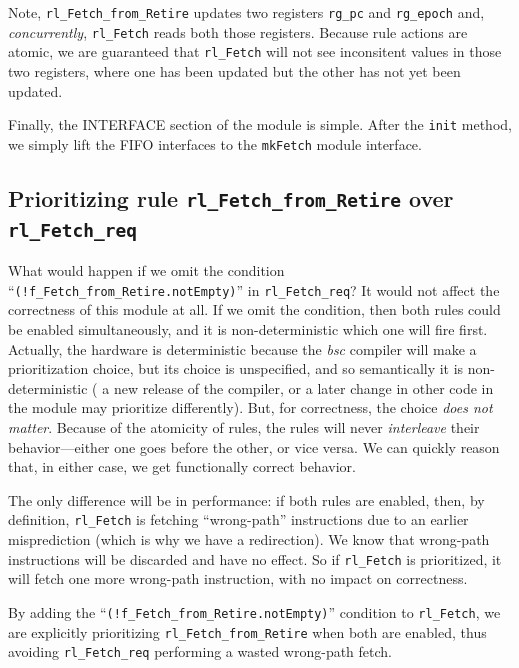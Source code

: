Note, \verb|rl_Fetch_from_Retire| updates two registers \verb|rg_pc|
and \verb|rg_epoch| and, \emph{concurrently}, \verb|rl_Fetch| reads
both those registers.  Because rule actions are atomic, we are
guaranteed that \verb|rl_Fetch| will not see inconsitent values in
those two registers, where one has been updated but the other has not
yet been updated.

Finally, the INTERFACE section of the module is simple.  After the
\verb|init| method, we simply lift the FIFO interfaces to the
\verb|mkFetch| module interface.


\subsection{Prioritizing rule {\tt rl\_Fetch\_from\_Retire} over {\tt rl\_Fetch\_req}}


What would happen if we omit the condition
``\verb|(!f_Fetch_from_Retire.notEmpty)|'' in \verb|rl_Fetch_req|?  It
would not affect the correctness of this module at all.  If we omit
the condition, then both rules could be enabled simultaneously, and it
is non-deterministic which one will fire first.  Actually, the
hardware is deterministic because the \emph{bsc} compiler will make a
prioritization choice, but its choice is unspecified, and so
semantically it is non-deterministic ({\eg} a new release of the
compiler, or a later change in other code in the module may prioritize
differently).  But, for correctness, the choice \emph{does not
matter}.  Because of the atomicity of rules, the rules will never
\emph{interleave} their behavior---either one goes before the other,
or vice versa.  We can quickly reason that, in either case, we get
functionally correct behavior.

The only difference will be in performance: if both rules are enabled,
then, by definition, \verb|rl_Fetch| is fetching ``wrong-path''
instructions due to an earlier misprediction (which is why we have a
redirection).  We know that wrong-path instructions will be discarded
and have no effect.  So if \verb|rl_Fetch| is prioritized, it will
fetch one more wrong-path instruction, with no impact on correctness.

By adding the ``\verb|(!f_Fetch_from_Retire.notEmpty)|'' condition to
\verb|rl_Fetch|, we are explicitly prioritizing
\verb|rl_Fetch_from_Retire| when both are enabled, thus avoiding
\verb|rl_Fetch_req| performing a wasted wrong-path fetch.

